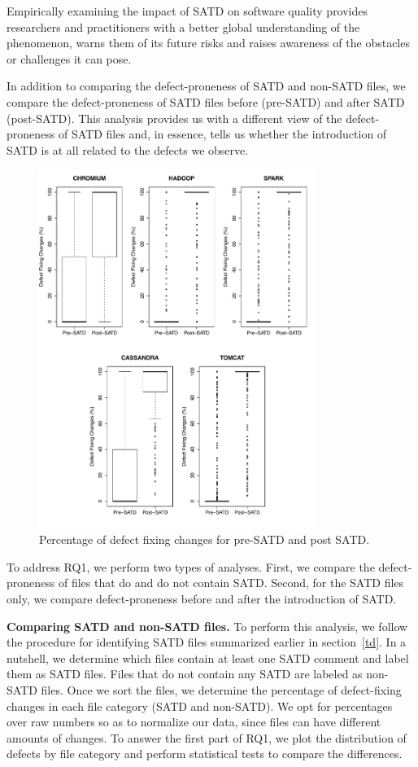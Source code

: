 Empirically examining the impact of SATD on software quality provides researchers and practitioners with a better global understanding of the phenomenon, warns them of its future risks and raises awareness of the obstacles or challenges it can pose.

In addition to comparing the defect-proneness of SATD and non-SATD files, we compare the defect-proneness of SATD files before (pre-SATD) and after SATD (post-SATD). This analysis provides us with a different view of the defect-proneness of SATD files and, in essence, tells us whether the introduction of SATD is at all related to the defects we observe.



\begin{figure}[tb]
	\centering
	\includegraphics[width=90mm]{figures/chapter3/rq1-2_correction}
	\caption{Percentage of defect fixing changes for  pre-SATD and post SATD.}
	\label{figure:preVpost}
\end{figure}

 To address RQ1, we perform two types of analyses. First, we compare the defect-proneness of files that do and do not contain SATD. Second, for the SATD files only, we compare defect-proneness before and after the introduction of SATD.

\noindent\textbf{Comparing SATD and non-SATD files.} To perform this analysis, we follow the procedure for identifying SATD files summarized earlier in section~\ref{td}. In a nutshell, we determine which files contain at least one SATD comment and label them as SATD files. Files that do not contain any SATD are labeled as non-SATD files. Once we sort the files, we determine the percentage of defect-fixing changes in each file category (SATD and non-SATD). We opt for percentages over raw numbers so as to normalize our data, since files can have different amounts of changes. To answer the first part of RQ1, we plot the distribution of defects by file category and perform statistical tests to compare the differences.

